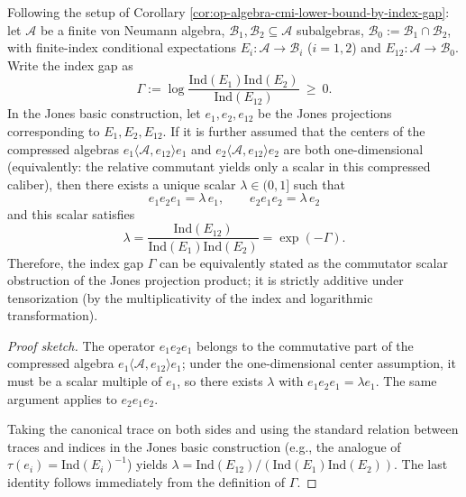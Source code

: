 \begin{proposition}\label{prop:op-algebra-jones-scalar-equals-exp-minus-gap}
Following the setup of Corollary \ref{cor:op-algebra-cmi-lower-bound-by-index-gap}:
let \(\mathcal{A}\) be a finite von Neumann algebra,
\(\mathcal{B}_1,\mathcal{B}_2\subseteq\mathcal{A}\) subalgebras,
\(\mathcal{B}_0:=\mathcal{B}_1\cap\mathcal{B}_2\), with finite-index conditional expectations
\(
E_i:\mathcal{A}\to\mathcal{B}_i
\) (\(i=1,2\)) and
\(
E_{12}:\mathcal{A}\to\mathcal{B}_0
\).
Write the index gap as
\[
\Gamma:=\log\frac{\mathrm{Ind}(E_1)\mathrm{Ind}(E_2)}{\mathrm{Ind}(E_{12})}\ \ge\ 0.
\]
In the Jones basic construction, let \(e_1,e_2,e_{12}\) be the Jones projections corresponding to \(E_1,E_2,E_{12}\).
If it is further assumed that the centers of the compressed algebras \(e_1\langle\mathcal{A},e_{12}\rangle e_1\) and \(e_2\langle\mathcal{A},e_{12}\rangle e_2\) are both one-dimensional (equivalently: the relative commutant yields only a scalar in this compressed caliber), then there exists a unique scalar \(\lambda\in(0,1]\) such that
\[
\boxed{\;
e_1e_2e_1=\lambda\,e_1,\qquad e_2e_1e_2=\lambda\,e_2\;}
\]
and this scalar satisfies
\[
\boxed{\;
\lambda=\frac{\mathrm{Ind}(E_{12})}{\mathrm{Ind}(E_1)\mathrm{Ind}(E_2)}
=\exp(-\Gamma).\;}
\]
Therefore, the index gap \(\Gamma\) can be equivalently stated as the commutator scalar obstruction of the Jones projection product; it is strictly additive under tensorization (by the multiplicativity of the index and logarithmic transformation).
\end{proposition}
\begin{proof}[Proof sketch]
The operator \(e_1e_2e_1\) belongs to the commutative part of the compressed algebra \(e_1\langle\mathcal{A},e_{12}\rangle e_1\); under the one-dimensional center assumption, it must be a scalar multiple of \(e_1\), so there exists \(\lambda\) with \(e_1e_2e_1=\lambda e_1\).
The same argument applies to \(e_2e_1e_2\).
\par
Taking the canonical trace on both sides and using the standard relation between traces and indices in the Jones basic construction (e.g., the analogue of \(\tau(e_i)=\mathrm{Ind}(E_i)^{-1}\)) yields
\(
\lambda=\mathrm{Ind}(E_{12})/(\mathrm{Ind}(E_1)\mathrm{Ind}(E_2))
\).
The last identity follows immediately from the definition of \(\Gamma\). \qedhere
\end{proof}

